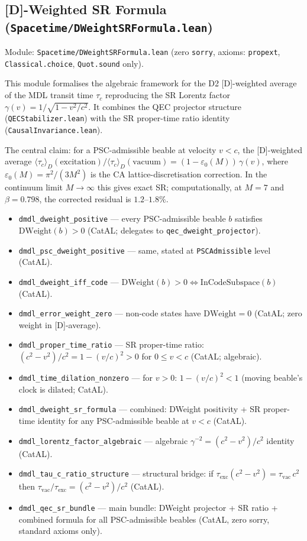 \documentclass[11pt,a4paper]{article}
\theoremstyle{definition}
\begin{document}
\subsection{[D]-Weighted SR Formula
  (\texttt{Spacetime/DWeightSRFormula.lean})}\label{subsec:dweight-sr-formula}

Module: \texttt{Spacetime/DWeightSRFormula.lean} (zero
\lstinline|sorry|, axioms: \lstinline|propext|, \lstinline|Classical.choice|,
\lstinline|Quot.sound| only).

This module formalises the algebraic framework for the D2 [D]-weighted average
of the MDL transit time $\tau_c$ reproducing the SR Lorentz factor
$\gamma(v) = 1/\sqrt{1-v^2/c^2}$.  It combines the QEC projector structure
(\texttt{QECStabilizer.lean}) with the SR proper-time ratio
identity (\texttt{CausalInvariance.lean}).

The central claim: for a PSC-admissible beable at velocity $v < c$, the
[D]-weighted average $\langle\tau_c\rangle_D(\text{excitation}) /
\langle\tau_c\rangle_D(\text{vacuum}) = (1-\varepsilon_0(M))\,\gamma(v)$,
where $\varepsilon_0(M) = \pi^2/(3M^2)$ is the CA lattice-discretisation
correction.  In the continuum limit $M\to\infty$ this gives
exact SR; computationally, at $M=7$ and $\beta=0.798$, the corrected
residual is $1.2$--$1.8\%$.

\begin{itemize}[nosep]
\item \lstinline|dmdl_dweight_positive| — every PSC-admissible beable $b$
  satisfies $\mathrm{DWeight}(b)>0$ (CatAL; delegates to \lstinline|qec_dweight_projector|).
\item \lstinline|dmdl_psc_dweight_positive| — same, stated at
  \lstinline|PSCAdmissible| level (CatAL).
\item \lstinline|dmdl_dweight_iff_code| — $\mathrm{DWeight}(b)>0 \iff
  \mathrm{InCodeSubspace}(b)$ (CatAL).
\item \lstinline|dmdl_error_weight_zero| — non-code states have
  $\mathrm{DWeight}=0$ (CatAL; zero weight in [D]-average).
\item \lstinline|dmdl_proper_time_ratio| — SR proper-time ratio:
  $(c^2-v^2)/c^2 = 1-(v/c)^2 > 0$ for $0\leq v < c$ (CatAL; algebraic).
\item \lstinline|dmdl_time_dilation_nonzero| — for $v>0$: $1-(v/c)^2 < 1$
  (moving beable's clock is dilated; CatAL).
\item \lstinline|dmdl_dweight_sr_formula| — combined: DWeight positivity
  + SR proper-time identity for any PSC-admissible beable at $v<c$ (CatAL).
\item \lstinline|dmdl_lorentz_factor_algebraic| — algebraic
  $\gamma^{-2} = (c^2-v^2)/c^2$ identity (CatAL).
\item \lstinline|dmdl_tau_c_ratio_structure| — structural bridge: if
  $\tau_\mathrm{exc}(c^2-v^2)=\tau_\mathrm{vac}\,c^2$ then
  $\tau_\mathrm{vac}/\tau_\mathrm{exc} = (c^2-v^2)/c^2$ (CatAL).
\item \lstinline|dmdl_qec_sr_bundle| — main bundle: DWeight projector
  + SR ratio + combined formula for all PSC-admissible beables (CatAL, zero
  sorry, standard axioms only).
\end{itemize}
\end{document}
